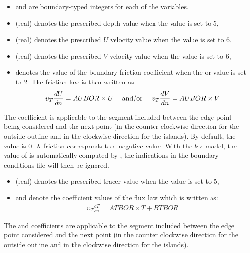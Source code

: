 \begin{itemize}
\item  {} and  are boundary-typed
integers for each of the variables.

\item {} (real) denotes the prescribed depth value when the
 value is set to 5,

\item {} (real) denotes the prescribed $U$ velocity value when
the  value is set to 6,

\item {} (real) denotes the prescribed $V$ velocity value when
the  value is set to 6,

\item {} denotes the value of the boundary friction coefficient when
the  or  value is set to 2.
The friction law is then written as:
\begin{align}
\upsilon_{T} \frac{dU}{dn} = AUBOR \times U {\rm ~~~~and/or~~~~ }
\upsilon_{T} \frac{dV}{dn} = AUBOR \times V
\end{align}
\end{itemize}
The  coefficient is applicable to the segment included between
the edge point being considered and the next point (in the counter clockwise
direction for the outside outline and in the clockwise direction for the islands).
By default, the  value is 0.
A friction corresponds to a negative value.
With the $k$-$\epsilon$ model, the value of  is automatically
computed by , the indications in the boundary conditions file will
then be ignored.

\begin{itemize}
\item {} (real) denotes the prescribed tracer value when the
 value is set to 5,

\item {} and  denote the coefficient values of the
flux law which is written as:
\begin{align}
\upsilon _{T} \frac{dT}{dn} = ATBOR \times T + BTBOR
\end{align}
\end{itemize}
The  and  coefficients are applicable to the
segment included between the edge point considered and the next point
(in the counter clockwise direction for the outside outline and in the
clockwise direction for the islands).

